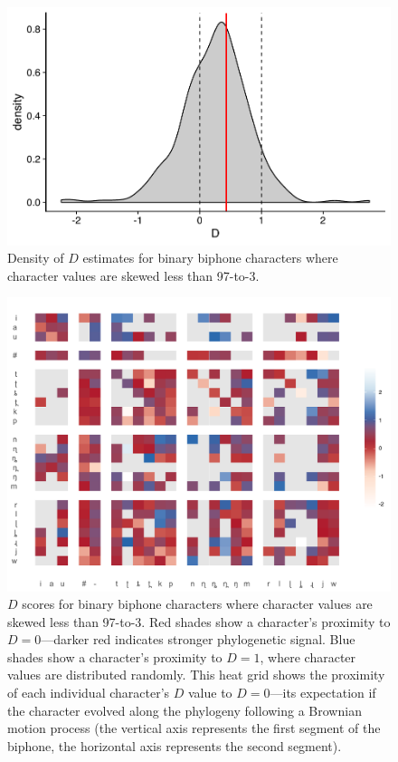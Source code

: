 \begin{figure}

{\centering \includegraphics[width=0.66\linewidth]{fig/d-density-filtered} 

}

\caption{Density of $D$ estimates for binary biphone characters where character values are skewed less than 97-to-3.}\label{fig:d-density-filtered}
\end{figure}

\begin{figure}

{\centering \includegraphics[width=0.75\linewidth]{fig/d-swatch-filtered} 

}

\caption{$D$ scores for binary biphone characters where character values are skewed less than 97-to-3. Red shades show a character's proximity to $D=0$---darker red indicates stronger phylogenetic signal. Blue shades show a character's proximity to $D=1$, where character values are distributed randomly. This heat grid shows the proximity of each individual character's $D$ value to $D=0$---its expectation if the character evolved along the phylogeny following a Brownian motion process (the vertical axis represents the first segment of the biphone, the horizontal axis represents the second segment).}\label{fig:d-swatch-filtered}
\end{figure}

